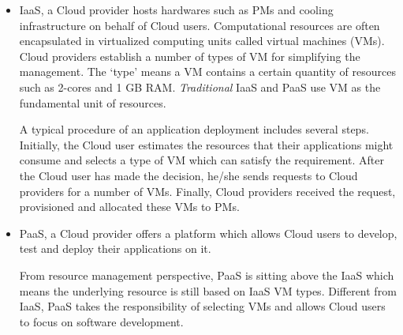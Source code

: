 \begin{itemize}
	\item IaaS, a Cloud provider hosts hardwares such as PMs and cooling infrastructure on behalf of Cloud users. Computational resources are often encapsulated in virtualized computing units called virtual machines (VMs). Cloud providers establish a number of types of VM for simplifying the management. The `type' means a VM contains a certain quantity of resources such as 2-cores and 1 GB RAM.  \emph{Traditional} IaaS and PaaS use VM as the fundamental unit of resources.

	A typical procedure of an application deployment includes several steps.
	Initially, the Cloud user estimates the resources that their applications might consume and selects a type of VM which can satisfy the requirement. After the Cloud user has made the decision, he/she sends requests to Cloud providers for a number of VMs. Finally, Cloud providers received the request, provisioned and allocated these VMs to PMs. 




 	\item PaaS, a Cloud provider offers a platform which allows Cloud users to develop, test and deploy their applications on it.

 	From resource management perspective, PaaS is sitting above the IaaS which means the underlying resource is still based on IaaS VM types. Different from IaaS, PaaS takes the responsibility of selecting VMs and allows Cloud users to focus on software development. 


\end{itemize}
